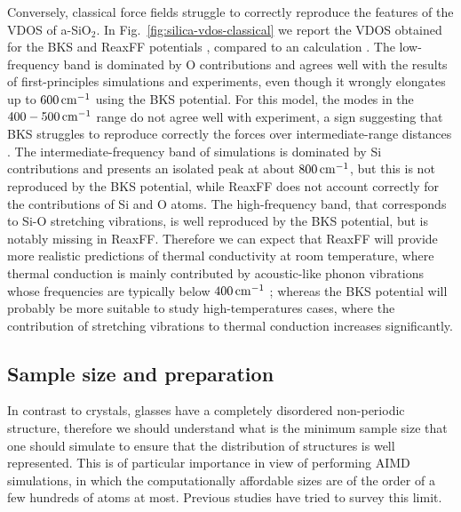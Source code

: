 Conversely, classical force fields struggle to correctly reproduce the features of the VDOS of a-SiO$_2$. In Fig.~\ref{fig:silica-vdos-classical} we report the VDOS obtained for the BKS and ReaxFF potentials \cite{Tian2017}, compared to an \abinitio calculation \cite{Bhattarai2016}. 
The low-frequency band is dominated by O contributions and agrees well with the results of first-principles simulations and experiments, even though it wrongly elongates up to $600\,\mathrm{cm^{-1}}$ using the BKS potential. For this model, the modes in the $400-500\,\mathrm{cm^{-1}}$ range do not agree well with experiment, a sign suggesting that BKS struggles to reproduce correctly the forces over intermediate-range distances \cite{Vollmayr1996,Benoit2002}. 
The intermediate-frequency band of \abinitio simulations is dominated by Si contributions and presents an isolated peak at about $800\,\mathrm{cm^{-1}}$, but this is not reproduced by the BKS potential, while ReaxFF does not account correctly for the contributions of Si and O atoms. 
The high-frequency band, that corresponds to Si-O stretching vibrations, is well reproduced by the BKS potential, but is notably missing in ReaxFF. 
Therefore we can expect that ReaxFF will provide more realistic predictions of thermal conductivity at room temperature, where thermal conduction is mainly contributed by acoustic-like phonon vibrations whose frequencies are typically below $400\,\mathrm{cm^{-1}}$ \cite{Bhattarai2016}; whereas the BKS potential will probably be more suitable to study high-temperatures cases, where the contribution of stretching vibrations to thermal conduction increases significantly. 


\subsection{Sample size and preparation}  \label{sec:glass-size}
In contrast to crystals, glasses have a completely disordered non-periodic structure, therefore we should understand what is the minimum sample size that one should simulate to ensure that the distribution of structures is well represented. This is of particular importance in view of performing AIMD simulations, in which the computationally affordable sizes are of the order of a few hundreds of atoms at most. Previous studies have tried to survey this limit. 

